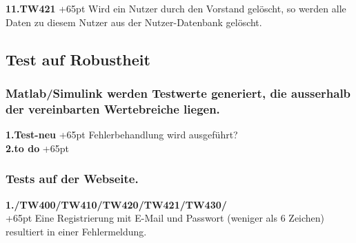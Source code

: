 \documentclass[fontsize = 12pt, paper = a4]{scrreprt}
\begin{document}
\textbf{11.TW421}
\hangindent+65pt 
Wird ein Nutzer durch den Vorstand gelöscht, so werden alle Daten zu diesem Nutzer aus der Nutzer-Datenbank gelöscht.



\subsection*{Test auf Robustheit}
\subsubsection*{Matlab/Simulink werden Testwerte generiert, die ausserhalb der vereinbarten Wertebreiche liegen. }


\textbf{1.Test-neu}
\hangindent+65pt 
Fehlerbehandlung wird ausgeführt?\\

\textbf{2.to do}
\hangindent+65pt 


\subsubsection*{Tests auf der Webseite.}


\textbf{1./TW400/TW410/TW420/TW421/TW430/}\\
\hangindent+65pt 
Eine Registrierung mit E-Mail und Passwort (weniger als 6 Zeichen) resultiert in einer Fehlermeldung.\\


\end{document}

